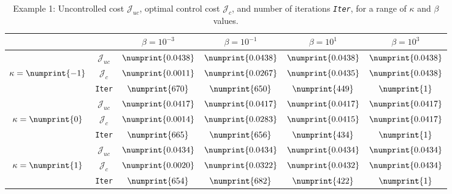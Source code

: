 \begin{table}
\begin{tabular}{ | c | c || c | c | c | c ||}
\hline
\multicolumn{2}{|c||}{}& $\beta = 10^{-3}$ & $\beta = 10^{-1}$ & $\beta = 10^{1}$ & $\beta = 10^{3}$  \\
\hline
\hline
 & $\mathcal{J}_{uc}$ & $\numprint{0.0438}$ & $\numprint{0.0438}$ & $\numprint{0.0438}$ & $\numprint{0.0438}$ \\
$\kappa= \numprint{-1}$  & $\mathcal{J}_c$ & $\numprint{0.0011}$ & $\numprint{0.0267}$ & $\numprint{0.0435}$ & $\numprint{0.0438}$ \\
& \texttt{Iter} & $\numprint{670}$ & $\numprint{650}$ & $\numprint{449}$ & $\numprint{1}$ \\
\hline
 & $\mathcal{J}_{uc}$ & $\numprint{0.0417}$ & $\numprint{0.0417}$ & $\numprint{0.0417}$ & $\numprint{0.0417}$ \\
$\kappa= \numprint{0}$  & $\mathcal{J}_c$ & $\numprint{0.0014}$ & $\numprint{0.0283}$ & $\numprint{0.0415}$ & $\numprint{0.0417}$ \\
& \texttt{Iter} & $\numprint{665}$ & $\numprint{656}$ & $\numprint{434}$ & $\numprint{1}$ \\
\hline
 & $\mathcal{J}_{uc}$ & $\numprint{0.0434}$ & $\numprint{0.0434}$ & $\numprint{0.0434}$ & $\numprint{0.0434}$ \\
$\kappa= \numprint{1}$  & $\mathcal{J}_c$ & $\numprint{0.0020}$ & $\numprint{0.0322}$ & $\numprint{0.0432}$ & $\numprint{0.0434}$ \\
& \texttt{Iter} & $\numprint{654}$ & $\numprint{682}$ & $\numprint{422}$ & $\numprint{1}$ \\
\hline
\end{tabular}
\caption{Example 1: Uncontrolled cost $\mathcal{J}_{uc}$, optimal control cost $\mathcal{J}_{c}$, and number of iterations \emph{\texttt{Iter}}, for a range of $\kappa$ and $\beta$ values.}
\label{TabS5:Prob1}
\end{table}